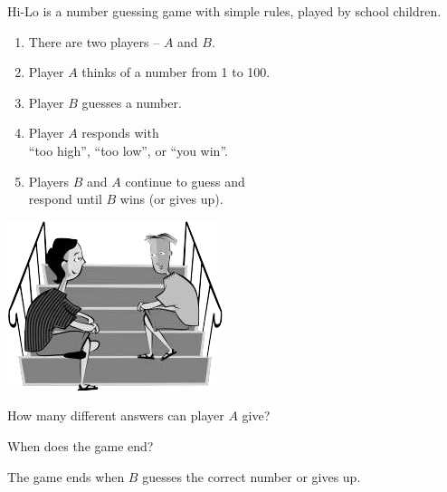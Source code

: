 

\begin{minipage}{0.58\textwidth}
Hi-Lo is a number guessing game with simple rules, played by school children.
\vspace{1ex}
\begin{enumerate}[nosep]
\item There are two players -- $A$ and $B$.
\item Player $A$ thinks of a number from 1 to 100.
\item Player $B$ guesses a number.
\item Player $A$ responds with \\ ``too high'', ``too low'', or ``you win''.
\item Players $B$ and $A$ continue to guess and \\ respond until $B$ wins (or gives up).
\end{enumerate}
\end{minipage}
\hfill
\begin{minipage}{0.40\textwidth}
\centering
\includegraphics[width=0.9\linewidth]{hi-lo1.png}
\end{minipage}




\Q How many different answers can player $A$ give? 

\vspace{1ex}


\Q When does the game end?

\begin{answer}[2em]
The game ends when $B$ guesses the correct number or gives up.
\end{answer}


